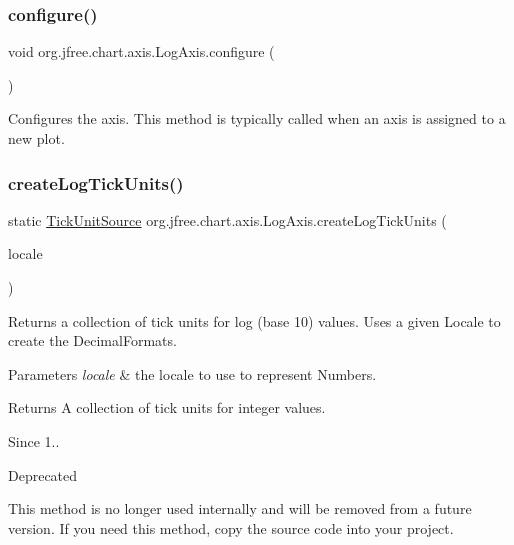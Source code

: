 \subsubsection{\texorpdfstring{configure()}{configure()}}
{\footnotesize\ttfamily void org.\+jfree.\+chart.\+axis.\+Log\+Axis.\+configure (\begin{DoxyParamCaption}{ }\end{DoxyParamCaption})}

Configures the axis. This method is typically called when an axis is assigned to a new plot. \mbox{\label{classorg_1_1jfree_1_1chart_1_1axis_1_1_log_axis_a1c8520b37c3859ceba7332717fd6ea36}} 
\subsubsection{\texorpdfstring{create\+Log\+Tick\+Units()}{createLogTickUnits()}}
{\footnotesize\ttfamily static \mbox{\hyperlink{interfaceorg_1_1jfree_1_1chart_1_1axis_1_1_tick_unit_source}{Tick\+Unit\+Source}} org.\+jfree.\+chart.\+axis.\+Log\+Axis.\+create\+Log\+Tick\+Units (\begin{DoxyParamCaption}\item[{Locale}]{locale }\end{DoxyParamCaption})\hspace{0.3cm}{\ttfamily [static]}}

Returns a collection of tick units for log (base 10) values. Uses a given Locale to create the Decimal\+Formats.


\begin{DoxyParams}{Parameters}
{\em locale} & the locale to use to represent Numbers.\\
\hline
\end{DoxyParams}
\begin{DoxyReturn}{Returns}
A collection of tick units for integer values.
\end{DoxyReturn}
\begin{DoxySince}{Since}
1..
\end{DoxySince}
\begin{DoxyRefDesc}{Deprecated}
\item[\mbox{\hyperlink{deprecated__deprecated000023}{Deprecated}}]This method is no longer used internally and will be removed from a future version. If you need this method, copy the source code into your project. \end{DoxyRefDesc}
\mbox{\label{classorg_1_1jfree_1_1chart_1_1axis_1_1_log_axis_a5a2c7ea6473133446a8d18b3eb572c81}} 
